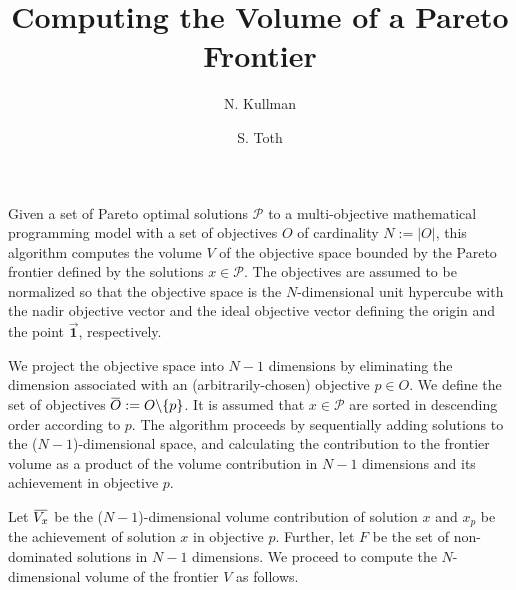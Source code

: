 \documentclass[11pt,letterpaper]{article}
\newcommand{\overbar}[1]{\mkern 1.5mu\overline{\mkern-1.5mu#1\mkern-1.5mu}\mkern 1.5mu}
\begin{document}
\title{Computing the Volume of a Pareto Frontier}
\author{N. Kullman \and S. Toth}
\maketitle



Given a set of Pareto optimal solutions $\mathcal{P}$ to a multi-objective mathematical programming model with a set of objectives $O$ of cardinality $N := |O|$, this algorithm computes the volume $V$ of the objective space bounded by the Pareto frontier defined by the solutions $x \in \mathcal{P}$. The objectives are assumed to be normalized so that the objective space is the $N$-dimensional unit hypercube with the nadir objective vector and the ideal objective vector defining the origin and the point $\vec{\mathbf{1}}$, respectively.

We project the objective space into $N-1$ dimensions by {\color{red}eliminating} the dimension associated with an (arbitrarily-chosen) objective $p \in O$. We define the set of objectives $\overbar{O} := O \backslash \{p\}$. It is assumed that $x \in \mathcal{P}$ are sorted in descending order according to $p$. The algorithm proceeds by sequentially adding solutions to the ($N-1$)-dimensional space, and calculating the contribution to the frontier volume as a product of the volume contribution in $N-1$ dimensions and its achievement in objective $p$.

Let
$\overbar{V_x}$ be the ($N-1$)-dimensional volume contribution of solution $x$ and
$x_p$ be the achievement of solution $x$ in objective $p$. Further, let
$F$ be the set of non-dominated solutions in $N-1$ dimensions.
We proceed to compute the $N$-dimensional volume of the frontier $V$ as follows.
\end{document}
